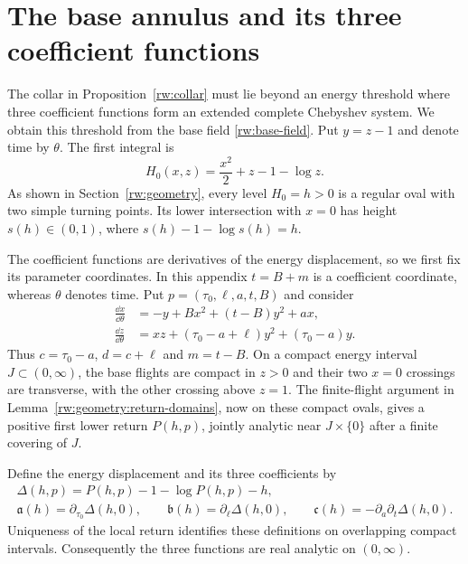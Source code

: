 \section{The base annulus and its three coefficient functions}
\label{rw:appendix-base-ect}

The collar in Proposition~\ref{rw:collar} must lie beyond an energy
threshold where three coefficient functions form an extended complete
Chebyshev system.  We obtain this threshold from the base field
\eqref{rw:base-field}.  Put $y=z-1$ and denote time by $\theta$.
The first integral is
\begin{equation}\label{rw:base-energy}
 H_0(x,z)=\frac{x^2}{2}+z-1-\log z.
\end{equation}
As shown in Section~\ref{rw:geometry}, every level $H_0=h>0$ is
a regular oval with two simple turning points. Its lower intersection
with $x=0$ has height $s(h)\in(0,1)$, where
$s(h)-1-\log s(h)=h$.

The coefficient functions are derivatives of the energy displacement,
so we first fix its parameter coordinates.  In this appendix $t=B+m$
is a coefficient coordinate, whereas $\theta$ denotes time.
Put $p=(\tau_0,\ell,a,t,B)$ and consider
\begin{equation}\label{rw:ect-family}
 \begin{aligned}
 \frac{\dd x}{\dd\theta}
   &=-y+Bx^2+(t-B)y^2+ax,\\
 \frac{\dd z}{\dd\theta}
   &=xz+(\tau_0-a+\ell)y^2+(\tau_0-a)y.
 \end{aligned}
\end{equation}
Thus $c=\tau_0-a$, $d=c+\ell$ and $m=t-B$.
On a compact energy interval $J\subset(0,\infty)$, the base flights
are compact in $z>0$ and their two $x=0$ crossings are transverse,
with the other crossing above $z=1$. The finite-flight argument in
Lemma~\ref{rw:geometry:return-domains}, now on these compact ovals,
gives a positive first lower return $P(h,p)$, jointly analytic near
$J\times\{0\}$ after a finite covering of $J$.

Define the energy displacement and its three coefficients by
\begin{equation}\label{rw:ect-coefficients}
 \begin{gathered}
 \Delta(h,p)=P(h,p)-1-\log P(h,p)-h,\\
 \mathfrak a(h)=\partial_{\tau_0}\Delta(h,0),\qquad
 \mathfrak b(h)=\partial_\ell\Delta(h,0),\qquad
 \mathfrak c(h)=-\partial_a\partial_t\Delta(h,0).
 \end{gathered}
\end{equation}
Uniqueness of the local return identifies these definitions on
overlapping compact intervals. Consequently the three functions are
real analytic on $(0,\infty)$.

